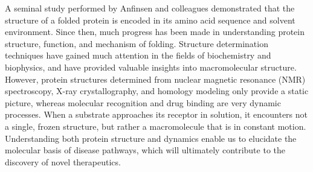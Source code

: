 

A seminal study performed by Anfinsen and colleagues demonstrated that the structure of a folded protein is encoded in its amino acid sequence and solvent environment.\cite{Anfinsen:1973vt} Since then, much progress has been made in understanding protein structure, function, and mechanism of folding.\cite{Dill:2012ce} Structure determination techniques have gained much attention in the fields of biochemistry and biophysics, and have provided valuable insights into macromolecular structure. However, protein structures determined from nuclear magnetic resonance (NMR) spectroscopy, X-ray crystallography, and homology modeling only provide a static picture, whereas molecular recognition and drug binding are very dynamic processes. When a substrate approaches its receptor in solution, it encounters not a single, frozen structure, but rather a macromolecule that is in constant motion. Understanding both protein structure and dynamics enable us to elucidate the molecular basis of disease pathways, which will ultimately contribute to the discovery of novel therapeutics. 

